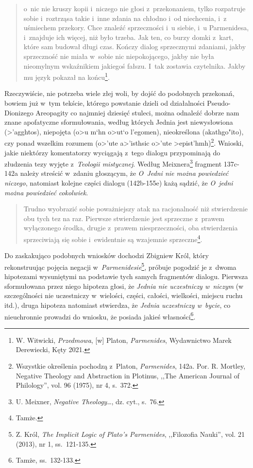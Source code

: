 \begin{quote}
o~nic nie kruszy kopii i~niczego nie głosi z~przekonaniem, tylko rozpatruje sobie i~roztrząsa takie i~inne zdania na chłodno i~od niechcenia, i~z uśmiechem przekory. Chce znaleźć sprzeczności i~u siebie, i~u Parmenidesa, i~znajduje ich więcej, niż było trzeba. Jak ten, co burzy domki z~kart, które sam budował długi czas. Kończy dialog sprzecznymi zdaniami, jakby sprzeczność nie miała w~sobie nic niepokojącego, jakby nie była nieomylnym wskaźnikiem jakiegoś fałszu. I~tak zostawia czytelnika. Jakby mu język pokazał na końcu\footnote{W. Witwicki, \textit{Przedmowa}, [w] Platon, \textit{Parmenides}, Wydawnictwo Marek Derewiecki, Kęty 2021.}.
\end{quote}

Rzeczywiście, nie potrzeba wiele złej woli, by dojść do podobnych przekonań, bowiem już w~tym tekście, którego powstanie dzieli od działalności Pseudo-Dionizego Areopagity co najmniej dziesięć stuleci, można odnaleźć dobrze nam znane apofatyczne sformułowania, według których Jednia jest niewysłowiona (\textgreek{>'agghtos}), niepojęta (\textgreek{o>u m`hn o>ut`o l'egomen}), nieokreślona (\textgreek{akathgo"ito}), czy ponad wszelkim rozumem (\textgreek{o>'ute a>'isthsic o>'ute >epist'hmh})\footnote{Wszystkie określenia pochodzą z~Platon, \textit{Parmenides}, 142a. Por. R. Mortley, Negative Theology and Abstraction in Plotinus, ,,The American Journal of Philology'', vol. 96 (1975), nr 4, s.~372.}. Wnioski, jakie niektórzy komentatorzy wyciągają z~tego dialogu przypominają do złudzenia tezy wyjęte z~\textit{Teologii mistycznej}. Według Meixnera\footnote{U. Meixner, \textit{Negative Theology}…, dz. cyt., s.~76.} fragment 137c-142a należy streścić w~zdaniu głoszącym, że \textit{O~Jedni nie można powiedzieć niczego}, natomiast kolejne części dialogu (142b-155e) każą sądzić, że \textit{O~jedni można powiedzieć cokolwiek}.

\begin{quote}
Trudno wyobrazić sobie poważniejszy atak na racjonalność niż stwierdzenie obu tych tez na raz. Pierwsze stwierdzenie jest sprzeczne z~prawem wyłączonego środka, drugie z~prawem niesprzeczności, oba stwierdzenia sprzeciwiają się sobie i~ewidentnie są wzajemnie sprzeczne\footnote{Tamże.}.
\end{quote}

Do zaskakująco podobnych wniosków dochodzi Zbigniew Król, który rekonstruując pojęcia negacji w~\textit{Parmenidesie}\footnote{Z. Król, \textit{The Implicit Logic of Plato's Parmenides}, ,,Filozofia Nauki'', vol. 21 (2013), nr 1, ss.~121-135.}, próbuje pogodzić je z~dwoma hipotezami wysuniętymi na podstawie tych samych fragmentów dialogu. Pierwsza sformułowana przez niego hipoteza głosi, że \textit{Jednia nie uczestniczy w~niczym} (w szczególności nie uczestniczy w~wielości, części, całości, wielkości, miejscu ruchu itd.), druga hipoteza natomiast stwierdza, że \textit{Jednia uczestniczy w~bycie}, co nieuchronnie prowadzi do wniosku, że posiada jakieś własności\footnote{Tamże, ss.~132-133.}.

